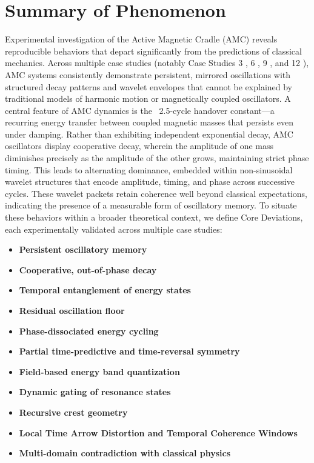 \documentclass[10pt,aps,pre,onecolumn,superscriptaddress,notitlepage]{revtex4-2}
\begin{document}
\section{Summary of Phenomenon}
\label{sec:sum_phenomenon}

Experimental investigation of the Active Magnetic Cradle (AMC) reveals reproducible behaviors that depart significantly from the predictions of classical mechanics. Across multiple case studies (notably Case Studies 3 \cite{karim2025cs3}, 6 \cite{karim2025cs6}, 9 \cite{karim2025cs9}, and 12 \cite{karim2025cs12}), AMC systems consistently demonstrate persistent, mirrored oscillations with structured decay patterns and wavelet envelopes that cannot be explained by traditional models of harmonic motion or magnetically coupled oscillators.
A central feature of AMC dynamics is the ~2.5-cycle handover constant—a recurring energy transfer between coupled magnetic masses that persists even under damping. Rather than exhibiting independent exponential decay, AMC oscillators display cooperative decay, wherein the amplitude of one mass diminishes precisely as the amplitude of the other grows, maintaining strict phase timing. This leads to alternating dominance, embedded within non-sinusoidal wavelet structures that encode amplitude, timing, and phase across successive cycles. These wavelet packets retain coherence well beyond classical expectations, indicating the presence of a measurable form of oscillatory memory. To situate these behaviors within a broader theoretical context, we define Core Deviations, each experimentally validated across multiple case studies:
\begin{itemize}

\item \textbf{Persistent oscillatory memory}
\item \textbf{Cooperative, out-of-phase decay}
\item \textbf{Temporal entanglement of energy states}
\item \textbf{Residual oscillation floor}
\item \textbf{Phase-dissociated energy cycling}
\item \textbf{Partial time-predictive and time-reversal symmetry}
\item \textbf{Field-based energy band quantization}
\item \textbf{Dynamic gating of resonance states}
\item \textbf{Recursive crest geometry}
\item \textbf{Local Time Arrow Distortion and Temporal Coherence Windows}
\item \textbf{Multi-domain contradiction with classical physics}

\end{itemize}
\end{document}

